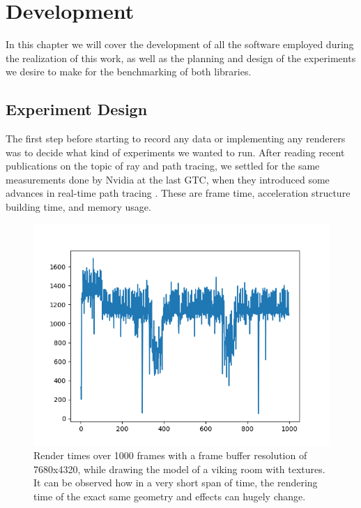 \chapter{Development}
In this chapter we will cover the development of all the software employed during the realization of this work, as well as the planning and design of the experiments we desire to make for the benchmarking of both libraries.

\section{Experiment Design}
The first step before starting to record any data or implementing any renderers was to decide what kind of experiments we wanted to run. After reading recent publications on the topic of ray and path tracing, we settled for the same measurements done by Nvidia at the last GTC, when they introduced some advances in real-time path tracing \cite{Clarberg2022}. These are frame time, acceleration structure building time, and memory usage.

\begin{figure}[hbt!]
    \centering
    \includegraphics[width=1.0\textwidth]{figuras/vulkan-7680x4320viking_room-textures-frametimes.png}
    \caption{Render times over 1000 frames with a frame buffer resolution of 7680x4320, while drawing the model of a viking room with textures. It can be observed how in a very short span of time, the rendering time of the exact same geometry and effects can hugely change.}
    \label{vulkan-7680x4320viking_room-textures-frametimes}
\end{figure}

